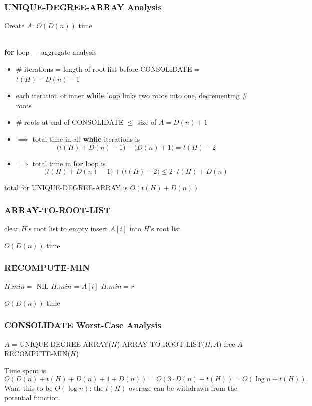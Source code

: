 \documentclass{beamer}
\newcommand{\stanza}{ \\~\ }
\begin{document}
\begin{frame} \frametitle{UNIQUE-DEGREE-ARRAY Analysis}
  Create $A$: $O(D(n))$ time \stanza

  \textbf{for} loop --- aggregate analysis
  \begin{itemize}
    \item \# iterations = length of root list before CONSOLIDATE = $t(H) + D(n) - 1$
    \item each iteration of inner \textbf{while} loop links two roots into one, decrementing \# roots
    \item \# roots at end of CONSOLIDATE $\leq $ size of $A = D(n)+1$
    \item $\implies$ total time in all \textbf{while} iterations is
    \[ \big(t(H)+D(n)-1 \big) - \big( D(n) + 1 \big) = t(H) - 2 \]
    \item $\implies$ total time in \textbf{for} loop is
    \[ \big(t(H) + D(n) - 1\big) + \big(t(H)-2 \big) \leq 2 \cdot t(H) + D(n) \]
  \end{itemize}

  total for UNIQUE-DEGREE-ARRAY is $O(t(H) + D(n))$
\end{frame}

\begin{frame} \frametitle{ARRAY-TO-ROOT-LIST}
  \begin{algorithmic}[1]
    \State clear $H$'s root list to empty
        \State insert $A[i]$ into $H$'s root list
      \EndIf
    \EndFor
    \EndFunction
  \end{algorithmic}
  \vspace{.5cm}
  $O(D(n))$ time
\end{frame}

\begin{frame} \frametitle{RECOMPUTE-MIN}
  \begin{algorithmic}[1]
    \State $H.min = $ NIL
        \State $H.min$ = $A[i]$
        \State $H.min = r$
      \EndIf
    \EndFor
    \EndFunction
  \end{algorithmic}
  \vspace{.5cm}
  $O(D(n))$ time
\end{frame}

\begin{frame} \frametitle{CONSOLIDATE Worst-Case Analysis}
  \begin{algorithmic}[1]
    \State $A$ = UNIQUE-DEGREE-ARRAY($H$) 
    \State ARRAY-TO-ROOT-LIST($H, A$) 
    \State free $A$ 
    \State RECOMPUTE-MIN($H$) 
    \EndFunction
  \end{algorithmic}
  \vspace{.5cm}
  Time spent is
  \[ O(D(n) + t(H) + D(n) + 1 + D(n)) = O(3 \cdot D(n) + t(H)) = O(\log n + t(H)) . \]
  Want this to be $O(\log n)$; the $t(H)$ overage can be withdrawn from the
  potential function.
\end{frame}
\end{document}
